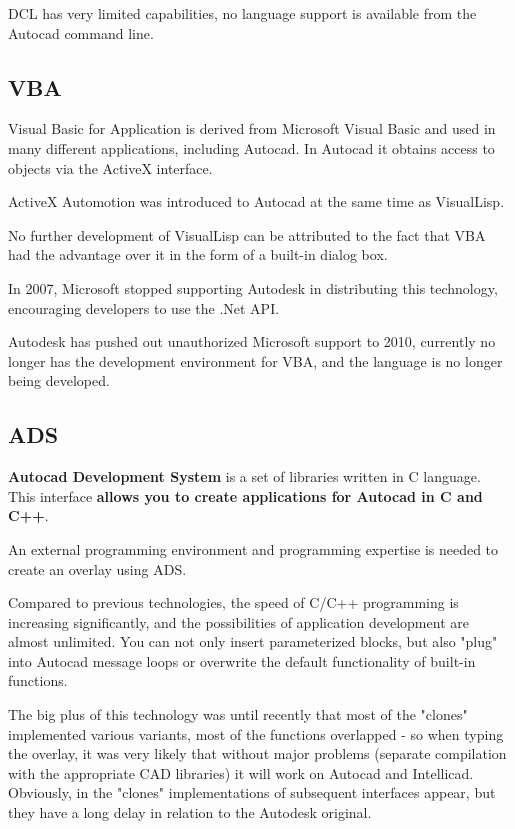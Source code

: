 \documentclass[a4paper, 11pt, article]{report}
\begin{document}
DCL has very limited capabilities, no language support is available from the Autocad command line.

\subsection{VBA}

Visual Basic for Application is derived from Microsoft Visual Basic and used in many different applications, including Autocad. In Autocad it obtains access to objects via the ActiveX interface.

ActiveX Automotion was introduced to Autocad at the same time as VisualLisp.

No further development of VisualLisp can be attributed to the fact that VBA had the advantage over it in the form of a built-in dialog box.

In 2007, Microsoft stopped supporting Autodesk in distributing this technology, encouraging developers to use the .Net API.

Autodesk has pushed out unauthorized Microsoft support to 2010, currently no longer has the development environment for VBA, and the language is no longer being developed.

\subsection{ADS}

\textbf{Autocad Development System} is a set of libraries written in C language. This interface \textbf{allows you to create applications for Autocad in C and C++}.

An external programming environment and programming expertise is needed to create an overlay using ADS.

Compared to previous technologies, the speed of C/C++ programming is increasing significantly, and the possibilities of application development are almost unlimited. You can not only insert parameterized blocks, but also "plug" into Autocad message loops or overwrite the default functionality of built-in functions.

The big plus of this technology was until recently that most of the "clones" implemented various variants, most of the functions overlapped - so when typing the overlay, it was very likely that without major problems (separate compilation with the appropriate CAD libraries) it will work on Autocad and Intellicad. Obviously, in the "clones" implementations of subsequent interfaces appear, but they have a long delay in relation to the Autodesk original.
\end{document}
